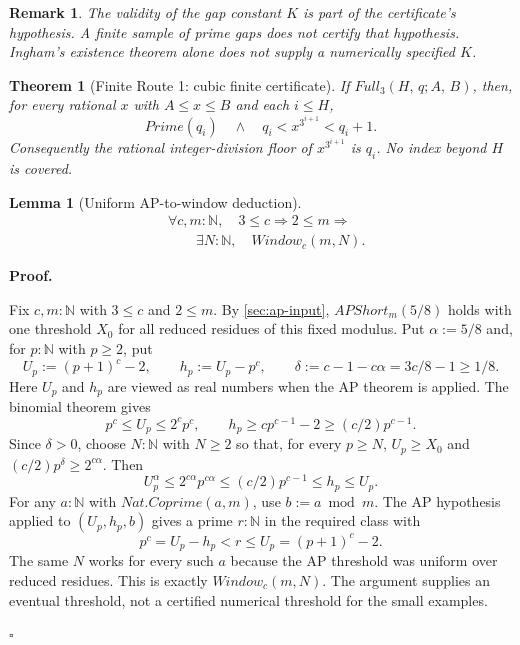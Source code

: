 \documentclass[11pt,reqno]{amsart}
\makeatletter
\newcommand{\N}{\mathbb N}
\theoremstyle{blueplain}
\newtheorem{theorem}{Theorem}[section]
\newtheorem{lemma}{Lemma}[section]
\newtheorem{remark}{Remark}[section]
\renewcommand{\qedsymbol}{\textcolor{proofqed}{\ensuremath{\square}}}
\renewenvironment{proof}[1][Proof]{\par\noindent\textbf{\textcolor{proofhead}{#1.}}\par\nobreak}{\par\nobreak\hfill\qedsymbol}
\newcommand{\defref}[1]{\hyperref[#1]{Definition~\ref*{#1}}}
\providecommand{\comma}{\allowbreak,\,}
\numberwithin{equation}{section}
\DeclareRobustCommand{\defref}[1]{%
  \hyperlink{def:#1}{\ensuremath{\csname PredicateName@#1\endcsname}}}
\def\defref#1{#1}%
\def\hyperlink#1#2{#2}}
\makeatother
\begin{document}
\begin{remark}
The validity of the gap constant \(K\) is part of the certificate's hypothesis.
A finite sample of prime gaps does not certify that hypothesis. Ingham's
existence theorem alone does not supply a numerically specified \(K\).
\end{remark}
\begin{theorem}[Finite Route 1: cubic finite certificate]\label{fin:thm:mills}
If \(\defref{Full}_3(H\comma q;A\comma B)\), then, for every rational \(x\) with
\(A\le x\le B\) and each \(i\le H\),
\[
\defref{Prime}(q_i)\quad\wedge\quad q_i<x^{3^{i+1}}<q_i+1.
\]
Consequently the rational integer-division floor of \(x^{3^{i+1}}\)
is \(q_i\). No index beyond \(H\) is covered.
\end{theorem}


\begin{lemma}[Uniform \protect\hyperlink{term:AP}{AP}-to-window deduction]\label{lem:ap-window}
\[
\begin{aligned}
&\forall c,m:\N,\quad 3\le c\Rightarrow2\le m\Rightarrow\\
&\qquad\exists N:\N,\quad\defref{Window}_c(m,N).
\end{aligned}
\]
\end{lemma}
\begin{proof}
Fix $c,m:\N$ with $3\le c$ and $2\le m$. By
\cref{sec:ap-input}, $\defref{APShort}_m(5/8)$ holds with one threshold
$X_0$ for all reduced residues of this fixed modulus. Put
$\alpha:=5/8$ and, for $p:\N$ with $p\ge2$, put
\[
U_p:=(p+1)^c-2,\qquad h_p:=U_p-p^c,\qquad
\delta:=c-1-c\alpha=3c/8-1\ge1/8.
\]
Here $U_p$ and $h_p$ are viewed as real numbers when the \hyperlink{term:AP}{AP} theorem is
applied. The binomial theorem gives
\[
p^c\le U_p\le2^cp^c,\qquad
h_p\ge cp^{c-1}-2\ge(c/2)p^{c-1}.
\]
Since $\delta>0$, choose $N:\N$ with $N\ge2$ so that, for every
$p\ge N$, $U_p\ge X_0$ and $(c/2)p^\delta\ge2^{c\alpha}$.
Then
\[
U_p^\alpha\le2^{c\alpha}p^{c\alpha}
\le(c/2)p^{c-1}\le h_p\le U_p.
\]
For any $a:\N$ with $\defref{Nat.Coprime}(a,m)$, use
$b:=a\bmod m$. The \hyperlink{term:AP}{AP} hypothesis applied to $(U_p,h_p,b)$ gives a prime
$r:\N$ in the required class with
\[
p^c=U_p-h_p<r\le U_p=(p+1)^c-2.
\]
The same $N$ works for every such $a$ because the \hyperlink{term:AP}{AP} threshold was uniform
over reduced residues. This is exactly $\defref{Window}_c(m,N)$.
The argument supplies an eventual threshold, not a certified numerical
threshold for the small examples.
\end{proof}
\end{document}
